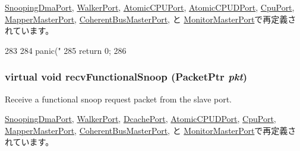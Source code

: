 \hyperlink{classArmISA_1_1TableWalker_1_1SnoopingDmaPort_ae1160d8f94f042aba1dc9a07a72e1e82}{SnoopingDmaPort}, \hyperlink{classX86ISA_1_1Walker_1_1WalkerPort_a886d584c81ee4e398ff8069907f6e1a5}{WalkerPort}, \hyperlink{classAtomicSimpleCPU_1_1AtomicCPUPort_ae1160d8f94f042aba1dc9a07a72e1e82}{AtomicCPUPort}, \hyperlink{classAtomicSimpleCPU_1_1AtomicCPUDPort_a886d584c81ee4e398ff8069907f6e1a5}{AtomicCPUDPort}, \hyperlink{classMemTest_1_1CpuPort_ae1160d8f94f042aba1dc9a07a72e1e82}{CpuPort}, \hyperlink{classAddrMapper_1_1MapperMasterPort_a886d584c81ee4e398ff8069907f6e1a5}{MapperMasterPort}, \hyperlink{classCoherentBus_1_1CoherentBusMasterPort_ae1160d8f94f042aba1dc9a07a72e1e82}{CoherentBusMasterPort}, と \hyperlink{classCommMonitor_1_1MonitorMasterPort_a886d584c81ee4e398ff8069907f6e1a5}{MonitorMasterPort}で再定義されています。


\begin{DoxyCode}
283     {
284         panic("%
285         return 0;
286     }
\end{DoxyCode}
\hypertarget{classMasterPort_af5b15bc08781cf0ba6190efc37d5b67e}{
\subsubsection[{recvFunctionalSnoop}]{\setlength{\rightskip}{0pt plus 5cm}virtual void recvFunctionalSnoop ({\bf PacketPtr} {\em pkt})}}
\label{classMasterPort_af5b15bc08781cf0ba6190efc37d5b67e}
Receive a functional snoop request packet from the slave port. 

\hyperlink{classArmISA_1_1TableWalker_1_1SnoopingDmaPort_af5b15bc08781cf0ba6190efc37d5b67e}{SnoopingDmaPort}, \hyperlink{classX86ISA_1_1Walker_1_1WalkerPort_a284dfb90c168233c9d416bc07de8fefe}{WalkerPort}, \hyperlink{classFullO3CPU_1_1DcachePort_af5b15bc08781cf0ba6190efc37d5b67e}{DcachePort}, \hyperlink{classAtomicSimpleCPU_1_1AtomicCPUDPort_a284dfb90c168233c9d416bc07de8fefe}{AtomicCPUDPort}, \hyperlink{classMemTest_1_1CpuPort_af5b15bc08781cf0ba6190efc37d5b67e}{CpuPort}, \hyperlink{classAddrMapper_1_1MapperMasterPort_a284dfb90c168233c9d416bc07de8fefe}{MapperMasterPort}, \hyperlink{classCoherentBus_1_1CoherentBusMasterPort_af5b15bc08781cf0ba6190efc37d5b67e}{CoherentBusMasterPort}, と \hyperlink{classCommMonitor_1_1MonitorMasterPort_a284dfb90c168233c9d416bc07de8fefe}{MonitorMasterPort}で再定義されています。


